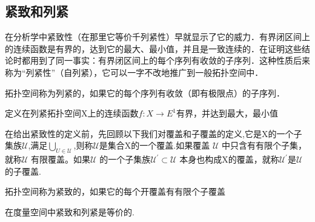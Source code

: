     \subsection*{紧致和列紧}
    在分析学中紧致性（在那里它等价千列紧性）早就显示了它的威力．有界闭区间上的连续函数是有界的，达到它的最大、最小值，并且是一致连续的．在证明这些结论时都用到了同一事实：有界闭区间上的每个序列有收敛的子序列．这种性质后来称为“列紧性”（自列紧），它可以一字不改地推广到一般拓扑空间中．
    \begin{definition}
        拓扑空间称为列紧的，如果它的每个序列有收敛（即有极限点）的子序列．
    \end{definition}
    \begin{corollary}
        定义在列紧拓扑空间X上的连续函数\(f: X \rightarrow E^1\)有界，并达到最大，最小值
    \end{corollary}
    在给出紧致性的定义前，先回顾以下我们对覆盖和子覆盖的定义,它是X的一个子集族\(\mathscr{U}\),满足\(\bigcup_{U \in \mathscr{U}}\),则称\(\mathscr{U}\)是集合X的一个覆盖.如果覆盖 \(\mathscr{U}\) 中只含有有限个子集，就称\(\mathscr{U}\) 有限覆盖。如果\(\mathscr{U}\) 的一个子集族\(\mathscr{U}^{'} \subset \mathscr{U} \) 本身也构成X的覆盖，就称\(\mathscr{U}^{'}\)是\(\mathscr{U}\)的子覆盖.
    \begin{definition}
        拓扑空间称为紧致的，如果它的每个开覆盖有有限个子覆盖
    \end{definition}
    在度量空间中紧致和列紧是等价的.
